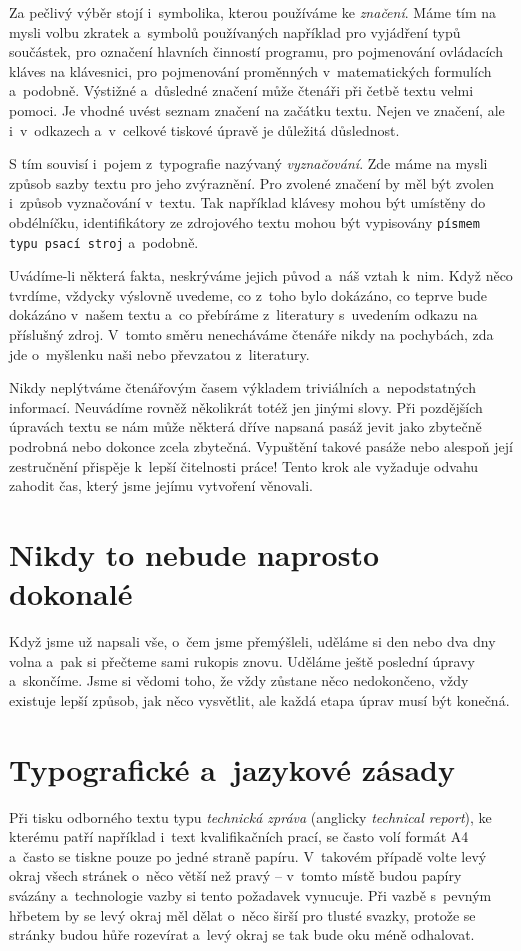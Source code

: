 Za pečlivý výběr stojí i~symbolika, kterou používáme ke {\it značení}. Máme tím na mysli volbu zkratek a~symbolů používaných například pro vyjádření typů součástek, pro označení hlavních činností programu, pro pojmenování ovládacích kláves na klávesnici, pro pojmenování proměnných v~matematických formulích a~podobně. Výstižné a~důsledné značení může čtenáři při četbě textu velmi pomoci. Je vhodné uvést seznam značení na začátku textu. Nejen ve značení, ale i~v~odkazech a~v~celkové tiskové úpravě je důležitá důslednost.

S tím souvisí i~pojem z~typografie nazývaný {\it vyznačování}. Zde máme na mysli způsob sazby textu pro jeho zvýraznění. Pro zvolené značení by měl být zvolen i~způsob vyznačování v~textu. Tak například klávesy mohou být umístěny do obdélníčku, identifikátory ze zdrojového textu mohou být vypisovány {\tt písmem typu psací stroj} a~podobně.

Uvádíme-li některá fakta, neskrýváme jejich původ a~náš vztah k~nim. Když něco tvrdíme, vždycky výslovně uvedeme, co z~toho bylo dokázáno, co teprve bude dokázáno v~našem textu a~co přebíráme z~literatury s~uvedením odkazu na příslušný zdroj. V~tomto směru nenecháváme čtenáře nikdy na pochybách, zda jde o~myšlenku naši nebo převzatou z~literatury.

Nikdy neplýtváme čtenářovým časem výkladem triviálních a~nepodstatných informací. Neuvádíme rovněž několikrát totéž jen jinými slovy. Při pozdějších úpravách textu se nám může některá dříve napsaná pasáž jevit jako zbytečně podrobná nebo dokonce zcela zbytečná. Vypuštění takové pasáže nebo alespoň její zestručnění přispěje k~lepší čitelnosti práce! Tento krok ale vyžaduje odvahu zahodit čas, který jsme jejímu vytvoření věnovali. 


\chapter{Nikdy to nebude naprosto dokonalé}
Když jsme už napsali vše, o~čem jsme přemýšleli, uděláme si den nebo dva dny volna a~pak si přečteme sami rukopis znovu. Uděláme ještě poslední úpravy a~skončíme. Jsme si vědomi toho, že vždy zůstane něco nedokončeno, vždy existuje lepší způsob, jak něco vysvětlit, ale každá etapa úprav musí být konečná.


\chapter{Typografické a~jazykové zásady}
Při tisku odborného textu typu {\it technická zpráva} (anglicky {\it technical report}), ke kterému patří například i~text kvalifikačních prací, se často volí formát A4 a~často se tiskne pouze po jedné straně papíru. V~takovém případě volte levý okraj všech stránek o~něco větší než pravý -- v~tomto místě budou papíry svázány a~technologie vazby si tento požadavek vynucuje. Při vazbě s~pevným hřbetem by se levý okraj měl dělat o~něco širší pro tlusté svazky, protože se stránky budou hůře rozevírat a~levý okraj se tak bude oku méně odhalovat.

